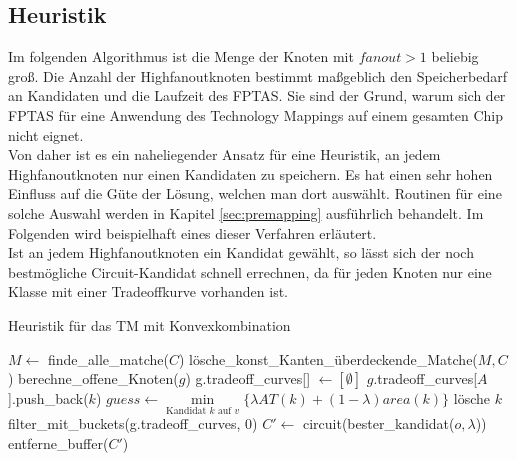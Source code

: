\documentclass[11pt, a4paper, german]{article}
\begin{document}
\subsection{Heuristik}
\label{subsec:heuristik}
Im folgenden Algorithmus ist die Menge der Knoten mit $fanout > 1$ beliebig groß.
Die Anzahl der Highfanoutknoten bestimmt maßgeblich den Speicherbedarf an Kandidaten und die Laufzeit des FPTAS. Sie sind der Grund, warum sich der FPTAS für eine Anwendung des Technology Mappings auf einem gesamten Chip nicht eignet. \\
Von daher ist es ein naheliegender Ansatz für eine Heuristik, an jedem Highfanoutknoten nur einen Kandidaten zu speichern. Es hat einen sehr hohen Einfluss auf die Güte der Lösung, welchen man dort auswählt. Routinen für eine solche Auswahl werden in Kapitel \ref{sec:premapping} ausführlich behandelt. Im Folgenden wird beispielhaft eines dieser Verfahren erläutert. \\
Ist an jedem Highfanoutknoten ein Kandidat gewählt, so lässt sich der noch bestmögliche Circuit-Kandidat schnell errechnen, da für jeden Knoten nur eine Klasse mit einer Tradeoffkurve vorhanden ist.\\

\LinesNumbered
\begin{algorithm}[H]
\DontPrintSemicolon
\caption{Heuristik f\"ur das TM mit Konvexkombination}

   $M \gets$ finde\_alle\_matche($C$)\;
   lösche\_konst\_Kanten\_überdeckende\_Matche($M, C$)\;
        {
			berechne\_offene\_Knoten($g$)\;	 
        }
  {
    g.tradeoff\_curves[] $\gets [\emptyset]$\;
    {
      {
        {
        	 {
			$g$.tradeoff\_curves[$A$].push\_back($k$)\;      	 
        	 }  
        }
      }
    }
  {
    $guess \gets \min\limits_{\text{Kandidat }k\text{ auf }v}\{ \lambda AT(k) + (1-\lambda) area(k)  \}$\;
    {
      {
	l\"osche $k$\;
      }
    }
  }    
    filter\_mit\_buckets(g.tradeoff\_curves, 0)\;    
  }
  $C' \gets $ circuit(bester\_kandidat($o, \lambda$))\;
  \Return entferne\_buffer($C'$)\;
\end{algorithm}\ \\
\end{document}
